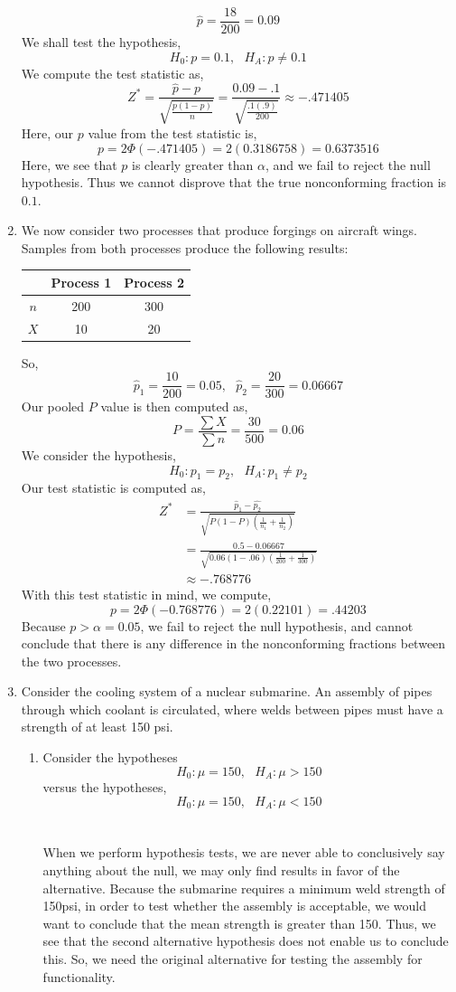 \documentclass[letterpaper,10pt]{article}
\begin{document}
\begin{enumerate}
\[\hat{p}=\frac{18}{200}=0.09\]
We shall test the hypothesis,
\[H_0: p=0.1,\ \ \ H_A: p\neq 0.1\]
We compute the test statistic as,
\[Z^*=\frac{\hat{p}-p}{\sqrt{\frac{p(1-p)}{n}}}=\frac{0.09-.1}{\sqrt{\frac{.1(.9)}{200}}}\approx -.471405\]
Here, our $p$ value from the test statistic is,
\[p=2\Phi(-.471405)=2(0.3186758)=0.6373516\]
Here, we see that $p$ is clearly greater than $\alpha$, and we fail to reject the null hypothesis. Thus we cannot disprove that the true nonconforming fraction is $0.1$.
\item We now consider two processes that produce forgings on aircraft wings. Samples from both processes produce the following results:
\begin{center}
\begin{tabular}{|c||c|c|}
\hline
& Process 1 & Process 2\\\hline
$n$ & 200 & 300\\\hline
$X$ & 10 & 20\\\hline
\end{tabular}
\end{center}
So,
\[\hat{p}_1=\frac{10}{200}=0.05,\ \ \ \hat{p}_2=\frac{20}{300}=0.06667\]
Our pooled $P$ value is then computed as,
\[P=\frac{\sum X}{\sum n}=\frac{30}{500}=0.06\]
We consider the hypothesis,
\[H_0: p_1=p_2,\ \ \ H_A: p_1\neq p_2\]
Our test statistic is computed as, 
\begin{align*}
Z^*&=\frac{\hat{p}_1-\hat{p_2}}{\sqrt{P(1-P)\left(\frac{1}{n_1}+\frac{1}{n_2}\right)}}\\
&=\frac{0.5-0.06667}{\sqrt{0.06(1-.06)\left(\frac{1}{200}+\frac{1}{300}\right)}}\\
&\approx -.768776
\end{align*}
With this test statistic in mind, we compute,
\[p=2\Phi(-0.768776)=2(0.22101)=.44203\]
Because $p>\alpha=0.05$, we fail to reject the null hypothesis, and cannot conclude that there is any difference in the nonconforming fractions between the two processes.
\item Consider the cooling system of a nuclear submarine. An assembly of pipes through which coolant is circulated, where welds between pipes must have a strength of at least 150 psi.
\begin{enumerate}
\item Consider the hypotheses
\[H_0: \mu=150,\ \ \ H_A: \mu >150\]
versus the hypotheses,
\[H_0: \mu=150,\ \ \ H_A: \mu <150\]\\\\
When we perform hypothesis tests, we are never able to conclusively say anything about the null, we may only find results in favor of the alternative. Because the submarine requires a minimum weld strength of 150psi, in order to test whether the assembly is acceptable, we would want to conclude that the mean strength is greater than 150. Thus, we see that the second alternative hypothesis does not enable us to conclude this. So, we need the original alternative for testing the assembly for functionality.

\end{enumerate}
\end{enumerate}
\end{document}
